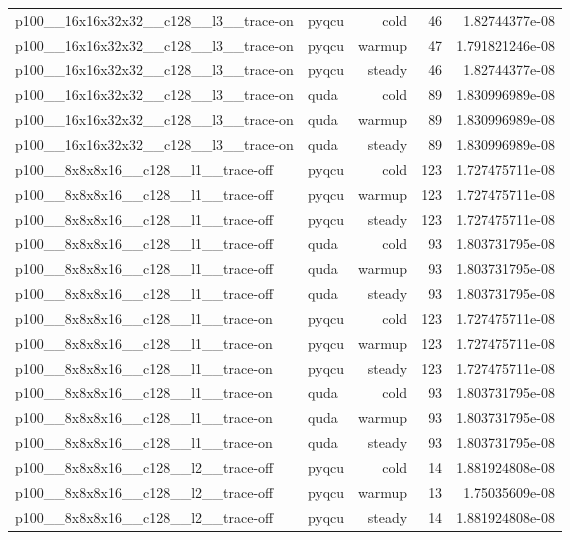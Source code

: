 \begin{table}[htbp]
\begin{tabular}{@{}llrrr@{}}
p100\_\_16x16x32x32\_\_c128\_\_l3\_\_trace-on & pyqcu & cold & 46 & 1.82744377e-08 \\
p100\_\_16x16x32x32\_\_c128\_\_l3\_\_trace-on & pyqcu & warmup & 47 & 1.791821246e-08 \\
p100\_\_16x16x32x32\_\_c128\_\_l3\_\_trace-on & pyqcu & steady & 46 & 1.82744377e-08 \\
p100\_\_16x16x32x32\_\_c128\_\_l3\_\_trace-on & quda & cold & 89 & 1.830996989e-08 \\
p100\_\_16x16x32x32\_\_c128\_\_l3\_\_trace-on & quda & warmup & 89 & 1.830996989e-08 \\
p100\_\_16x16x32x32\_\_c128\_\_l3\_\_trace-on & quda & steady & 89 & 1.830996989e-08 \\
p100\_\_8x8x8x16\_\_c128\_\_l1\_\_trace-off & pyqcu & cold & 123 & 1.727475711e-08 \\
p100\_\_8x8x8x16\_\_c128\_\_l1\_\_trace-off & pyqcu & warmup & 123 & 1.727475711e-08 \\
p100\_\_8x8x8x16\_\_c128\_\_l1\_\_trace-off & pyqcu & steady & 123 & 1.727475711e-08 \\
p100\_\_8x8x8x16\_\_c128\_\_l1\_\_trace-off & quda & cold & 93 & 1.803731795e-08 \\
p100\_\_8x8x8x16\_\_c128\_\_l1\_\_trace-off & quda & warmup & 93 & 1.803731795e-08 \\
p100\_\_8x8x8x16\_\_c128\_\_l1\_\_trace-off & quda & steady & 93 & 1.803731795e-08 \\
p100\_\_8x8x8x16\_\_c128\_\_l1\_\_trace-on & pyqcu & cold & 123 & 1.727475711e-08 \\
p100\_\_8x8x8x16\_\_c128\_\_l1\_\_trace-on & pyqcu & warmup & 123 & 1.727475711e-08 \\
p100\_\_8x8x8x16\_\_c128\_\_l1\_\_trace-on & pyqcu & steady & 123 & 1.727475711e-08 \\
p100\_\_8x8x8x16\_\_c128\_\_l1\_\_trace-on & quda & cold & 93 & 1.803731795e-08 \\
p100\_\_8x8x8x16\_\_c128\_\_l1\_\_trace-on & quda & warmup & 93 & 1.803731795e-08 \\
p100\_\_8x8x8x16\_\_c128\_\_l1\_\_trace-on & quda & steady & 93 & 1.803731795e-08 \\
p100\_\_8x8x8x16\_\_c128\_\_l2\_\_trace-off & pyqcu & cold & 14 & 1.881924808e-08 \\
p100\_\_8x8x8x16\_\_c128\_\_l2\_\_trace-off & pyqcu & warmup & 13 & 1.75035609e-08 \\
p100\_\_8x8x8x16\_\_c128\_\_l2\_\_trace-off & pyqcu & steady & 14 & 1.881924808e-08 \\

\end{tabular}
\end{table}
